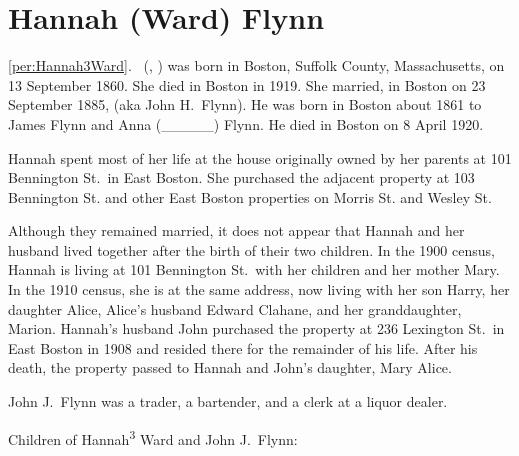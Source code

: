 \section{Hannah (Ward) Flynn}

\ref{per:Hannah3Ward}.\  (, ) was born in Boston, Suffolk County, Massachusetts, on 13 September 1860.\cite{Hannah3WardBirth} She died in Boston in 1919.\cite{Hannah3WardDeath} She married, in Boston on 23 September 1885, \cite{Hannah3WardMarriage} (aka John H.\ Flynn\cite{JohnJHFlynn}). He was born in Boston about 1861 to James Flynn and Anna (\_\_\_\_\_) Flynn.\cite{Hannah3WardMarriage} He died in Boston on 8 April 1920.\cite{JohnFlynnDeath}

Hannah spent most of her life at the house originally owned by her parents at 101 Bennington St.\ in East Boston.\cite{101Bennington,Census1880DavidWard,Census1910HannahWard} She purchased the adjacent property at 103 Bennington St.\cite{103BenningtonSt} and other East Boston properties on Morris St.\cite{MorrisSt} and Wesley St.\cite{WesleySt} 

Although they remained married, it does not appear that Hannah and her husband lived together after the birth of their two children.\cite{HannahWardDirectories} In the 1900 census, Hannah is living at 101 Bennington St.\ with her children and her mother Mary.\cite{Census1900HannahWard} In the 1910 census, she is at the same address, now living with her son Harry, her daughter Alice, Alice's husband Edward Clahane, and her granddaughter, Marion.\cite{Census1910HannahWard} Hannah's husband John purchased the property at 236 Lexington St.\ in East Boston in 1908 and resided there for the remainder of his life.\cite{236Lexington,JohnFlynnDeath} After his death, the property passed to Hannah and John's daughter, Mary Alice.\cite{236Lexington2}

John J.\ Flynn was a trader,\cite{Hannah3WardMarriage} a bartender,\cite{Harry4FlynnBirth} and a clerk at a liquor dealer.\cite{JohnFlynn1889,BropheyLiquors}

\begin{KidsIntro}
	Children of Hannah\textsuperscript{3} Ward and John J.\ Flynn:
\end{KidsIntro}

